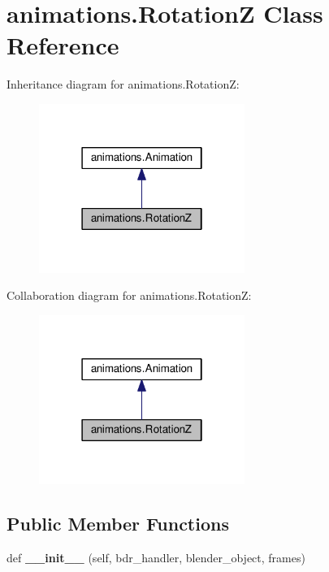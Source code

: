 \hypertarget{classanimations_1_1RotationZ}{}\section{animations.\+RotationZ Class Reference}
\label{classanimations_1_1RotationZ}


Inheritance diagram for animations.\+RotationZ\+:\nopagebreak
\begin{figure}[H]
\begin{center}
\leavevmode
\includegraphics[width=190pt]{classanimations_1_1RotationZ__inherit__graph}
\end{center}
\end{figure}


Collaboration diagram for animations.\+RotationZ\+:\nopagebreak
\begin{figure}[H]
\begin{center}
\leavevmode
\includegraphics[width=190pt]{classanimations_1_1RotationZ__coll__graph}
\end{center}
\end{figure}
\subsection*{Public Member Functions}
\begin{DoxyCompactItemize}
\item 
def {\bfseries \+\_\+\+\_\+init\+\_\+\+\_\+} (self, bdr\+\_\+handler, blender\+\_\+object, frames)\hypertarget{classanimations_1_1RotationZ_a160c6953e9099be9ed0bd9cc565a15b3}{}\label{classanimations_1_1RotationZ_a160c6953e9099be9ed0bd9cc565a15b3}

\end{DoxyCompactItemize}
